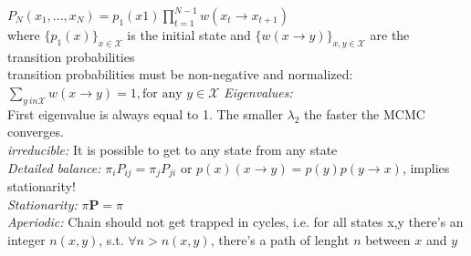 \documentclass[9pt,parskip]{scrartcl}
\begin{document}
\begin{multicols*}{4}
$P_N (x_1,... ,x_N ) = p_1(x1) \prod^{N-1}_{t=1} w(x_t \to x_{t+1})$ \\ 
where $\{p_1(x)\}_{x \in \mathcal{X}}$ is the initial state and $\{w(x \to y)\}_{x,y \in \mathcal{X}}$ are the
transition probabilities \\
 transition probabilities must be
non-negative and normalized:
$\sum_{y \ in \mathcal{X}} w(x \to y) = 1 , \text{for any } y \in \mathcal{X}$
\textit{Eigenvalues: }\\
First eigenvalue is always equal to 1. The smaller $\lambda_2$ the faster the MCMC converges. \\
\textit{irreducible: } It is possible to get to any state from any state \\
\textit{Detailed balance: } $\pi _{i}P_{ij}=\pi _{j}P_{ji}$ or $p(x) (x \to y) = p(y) p(y \to x)$, implies stationarity! \\
\textit{Stationarity: } $\pi \mathbf {P} =\pi$ \\
\textit{Aperiodic: } Chain should not get trapped in cycles, i.e. for all states x,y there's an integer $n(x,y)$, s.t. $\forall n > n(x,y)$, there's a path of lenght $n$ between $x$ and $y$ \\



\end{multicols*}
\end{document}
